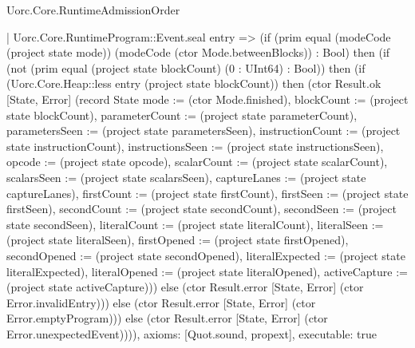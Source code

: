 \begin{lexlean}{Uorc.Core.RuntimeAdmissionOrder}
\begin{semanticmodule}
{    | Uorc.Core.RuntimeProgram::Event.seal entry => (if (prim equal (modeCode (project state mode)) (modeCode (ctor Mode.betweenBlocks)) : Bool) then (if (not (prim equal (project state blockCount) (0 : UInt64) : Bool)) then (if (Uorc.Core.Heap::less entry (project state blockCount)) then (ctor Result.ok [State, Error] (record State {mode := (ctor Mode.finished), blockCount := (project state blockCount), parameterCount := (project state parameterCount), parametersSeen := (project state parametersSeen), instructionCount := (project state instructionCount), instructionsSeen := (project state instructionsSeen), opcode := (project state opcode), scalarCount := (project state scalarCount), scalarsSeen := (project state scalarsSeen), captureLanes := (project state captureLanes), firstCount := (project state firstCount), firstSeen := (project state firstSeen), secondCount := (project state secondCount), secondSeen := (project state secondSeen), literalCount := (project state literalCount), literalSeen := (project state literalSeen), firstOpened := (project state firstOpened), secondOpened := (project state secondOpened), literalExpected := (project state literalExpected), literalOpened := (project state literalOpened), activeCapture := (project state activeCapture)})) else (ctor Result.error [State, Error] (ctor Error.invalidEntry))) else (ctor Result.error [State, Error] (ctor Error.emptyProgram))) else (ctor Result.error [State, Error] (ctor Error.unexpectedEvent)))),
  axioms: [Quot.sound, propext],
  executable: true
}
\end{semanticmodule}
\end{lexlean}
